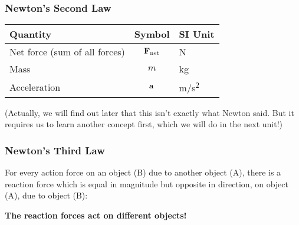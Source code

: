 \documentclass[12pt,compress,aspectratio=169]{beamer}
\newcommand{\mb}[1]{\ensuremath\mathbf{#1}}
\begin{document}
\begin{frame}
  \frametitle{Newton's Second Law}
  \begin{center}
  \end{center}

  \vspace{-.3in}{\Huge
    \begin{displaymath}
      \boxed{\mb{F}_{\textrm{net}}=\Sigma\mb{F}=m\mb{a}}
    \end{displaymath}
  }
  
  \begin{center}
    \begin{tabular}{l|c|l}
      \rowcolor{pink}
      \textbf{Quantity} & \textbf{Symbol} & \textbf{SI Unit} \\ \hline
      Net force (sum of all forces)  & $\mb{F}_{\textrm{net}}$ & \si{N}\\
      Mass         & $m$       & \si{kg}\\
      Acceleration & $\mb{a}$  & \si{m/s^2}\\
    \end{tabular}
  \end{center}

  (Actually, we will find out later that this isn't exactly what Newton said.
  But it requires us to learn another concept first, which we will do in the
  next unit!)
\end{frame}


\begin{frame}
  \frametitle{Newton's Third Law}

  \begin{center}
  \end{center}
 
  For every action force on an object (B) due to another object (A), there is a
  reaction force which is equal in magnitude but opposite in direction, on
  object (A), due to object (B):

  \vspace{-.3in}{\Huge
    \begin{displaymath}
      \boxed{\mb{F}_{\textrm{A on B}} = -\mb{F}_{\textrm{B on A}}}
    \end{displaymath}
  }
  
  \textbf{The reaction forces act on different objects!}
\end{frame}
\end{document}
